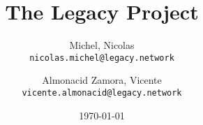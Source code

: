 \documentclass[12pt,french,english]{report} %
\newcommand{\bibpath}{..}
\begin{document}
\title{The Legacy Project}
\author{
  Michel, Nicolas\\
  \texttt{nicolas.michel@legacy.network}
  \and
  Almonacid Zamora, Vicente\\
  \texttt{vicente.almonacid@legacy.network}
}
\date{\today}
\maketitle


\tableofcontents





%
%
%
%

		
\end{document}
